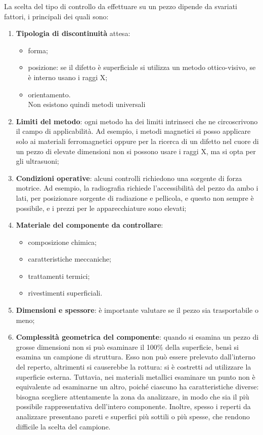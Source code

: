 La scelta del tipo di controllo da effettuare su un pezzo dipende da svariati fattori, i principali dei quali sono:
\begin{enumerate}
    \item \textbf{Tipologia di discontinuità} attesa:
    \begin{itemize}
        \item forma;
        \item posizione: se il difetto è superficiale si utilizza un metodo ottico-visivo, se è interno usano i raggi X;
        \item orientamento.\\
        Non esistono quindi metodi universali
    \end{itemize}
    \item \textbf{Limiti del metodo}: ogni metodo ha dei limiti intrinseci che ne circoscrivono il campo di applicabilità. Ad esempio, i metodi magnetici si posso applicare solo ai materiali ferromagnetici oppure per la ricerca di un difetto nel cuore di un pezzo di elevate dimensioni non si possono usare i raggi X, ma si opta per gli ultrasuoni;
    \item \textbf{Condizioni operative}: alcuni controlli richiedono una sorgente di forza motrice. Ad esempio, la radiografia richiede l’accessibilità del pezzo da ambo i lati, per posizionare sorgente di radiazione e pellicola, e questo non sempre è possibile, e i prezzi per le apparecchiature sono elevati;
    \item \textbf{Materiale del componente da controllare}:
    \begin{itemize}
        \item composizione chimica;
        \item caratteristiche meccaniche;
        \item trattamenti termici;
        \item rivestimenti superficiali.
    \end{itemize}
    \item \textbf{Dimensioni e spessore}: è importante valutare se il pezzo sia trasportabile o meno;
    \item \textbf{Complessità geometrica del componente}: quando si esamina un pezzo di grosse dimensioni non si può esaminare il 100\% della superficie, bensì si esamina un campione di struttura. Esso non può essere prelevato dall’interno del reperto, altrimenti si causerebbe la rottura: si è costretti ad utilizzare la superficie esterna. Tuttavia, nei materiali metallici esaminare un punto non è equivalente ad esaminarne un altro, poiché ciascuno ha caratteristiche diverse: bisogna scegliere attentamente la zona da analizzare, in modo che sia il più possibile rappresentativa dell’intero componente. Inoltre, spesso i reperti da analizzare presentano pareti e superfici più sottili o più spesse, che rendono difficile la scelta del campione.
\end{enumerate}

